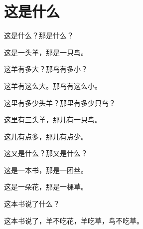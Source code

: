 \documentclass[12pt,UTF-8,openany]{ctexbook}
\begin{document}
\hanzibox{}\hanzibox{}\hanzibox{}\hanzibox{}\hspace{1em}\hanzibox{}\hanzibox{}\hanzibox{}\hanzibox{}






\chapter{这是什么}

\begin{large}
    
    这是什么？那是什么？
    
    这是一头羊，那是一只鸟。
    
    这羊有多大？那鸟有多小？
    
    这羊有这么大。那鸟有这么小。
    
    这里有多少头羊？那里有多少只鸟？
    
    这里有三头羊，那儿有一只鸟。
    
    这儿有点多，那儿有点少。
    
    
    
    这又是什么？那又是什么？
    
    这是一本书，那是一团丝。
    
    这是一朵花，那是一棵草。
    
    这本书说了什么？
    
    这本书说了，羊不吃花，羊吃草，鸟不吃草。
    
\end{large}


\clearpage

\begin{center}
    
\end{center}


\hanzibox{}\hanzibox{}\hanzibox{}\hanzibox{}\hspace{1em}\hanzibox{}\hanzibox{}\hanzibox{}\hanzibox{}

\hanzibox{}\hanzibox{}\hanzibox{}\hanzibox{}\hspace{1em}\hanzibox{}\hanzibox{}\hanzibox{}\hanzibox{}

\hanzibox{}\hanzibox{}\hanzibox{}\hanzibox{}\hspace{1em}\hanzibox{}\hanzibox{}\hanzibox{}\hanzibox{}
\end{document}
